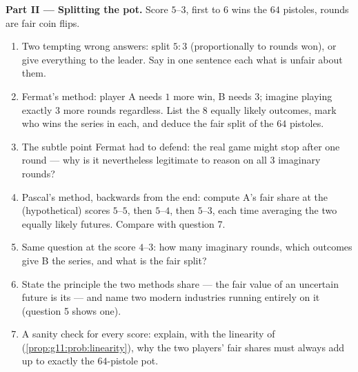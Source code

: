\begin{problem}
\medskip
\noindent\textbf{Part II --- Splitting the pot.}
Score $5$--$3$, first to $6$ wins the $64$ pistoles, rounds are
fair coin flips.
\begin{enumerate}[resume]
  \item Two tempting wrong answers: split $5 : 3$
        (proportionally to rounds won), or give everything to
        the leader. Say in one sentence each what is unfair
        about them.
  \item Fermat's method: player A needs $1$ more win, B needs
        $3$; imagine playing exactly $3$ more rounds regardless.
        List the $8$ equally likely outcomes, mark who wins the
        series in each, and deduce the fair split of the $64$
        pistoles.
  \item The subtle point Fermat had to defend: the real game
        might stop after one round --- why is it nevertheless
        legitimate to reason on all $3$ imaginary rounds?
  \item Pascal's method, backwards from the end: compute A's
        fair share at the (hypothetical) scores $5$--$5$, then
        $5$--$4$, then $5$--$3$, each time averaging the two
        equally likely futures. Compare with question 7.
  \item Same question at the score $4$--$3$: how many imaginary
        rounds, which outcomes give B the series, and what is
        the fair split?
  \item State the principle the two methods share --- the fair
        value of an uncertain future is its \emph{}
        --- and name two modern industries running entirely on
        it (question 5 shows one).
  \item A sanity check for every score: explain, with the
        linearity of 
        (\cref{prop:g11:prob:linearity}), why the two players'
        fair shares must always add up to exactly the
        $64$-pistole pot.
\end{enumerate}


\end{problem}
